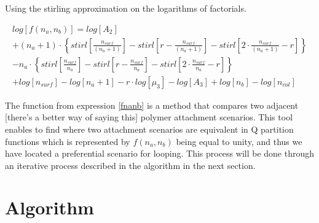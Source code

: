 \documentclass[10pt,letterpaper]{article}
\newcommand{\nads}[1]{
    \ensuremath{
        \frac{
            n_{surf}
        }{
            #1
        }
    }
}
\newcommand{\nlp}[1]{
    \ensuremath{
        r
        -
        \nads{#1}
    }
}
\newcommand{\StirlOFgOFm}[1]{
	\ensuremath{
	#1
	\cdot
	\left\{
    	stirl
    	\left[
    	        \nads{#1}
    	\right]
    	-
    	stirl
    	\left[
        	    \nlp{#1}
    	\right]
    	-
    	stirl
    	\left[
        	    2
        	    \cdot
        	    \nads{#1}
        	    -
        	    r
    	\right]
	\right\}
	}
}
\begin{document}
\noindent Using the stirling approximation on the logarithms of factorials.

\begin{multline}
	log
	\left[
	    f(n_a,n_b)
	\right]
	=
	log
	\left[
		A_2
	\right]\\
	+
	\StirlOFgOFm{(n_a+1)}\\
    -
    \StirlOFgOFm{n_a}\\
	+
	log
	\left[
		n_{surf}
	\right]
		-
		log
		\left[
		n_a+1
		\right]
		-
		r
		\cdot
		log
		\left[
		\mu_{3}
		\right]
		-
		log
		\left[
		A_3
		\right]
		+
		log
		\left[
		n_{b}
		\right]
		-
		log
		\left[
		n_{vol}	
	\right]
		\label{stirlOFexpnd1}
\end{multline}

\noindent The function from expression \ref{fnanb} is a method that compares two adjacent [there's a better way of saying this] polymer attachment scenarios. This tool enables to find where two attachment scenarios are equivalent in Q partition functions which is represented by $f(n_a,n_b)$ being equal to unity, and thus we have located a preferential scenario for looping. This process will be done through an iterative process described in the algorithm in the next section.

\section*{Algorithm}





\end{document}
